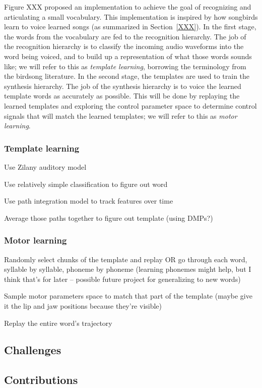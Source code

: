 \documentclass{article}
\begin{document}
Figure XXX proposed an implementation
to achieve the goal of recognizing
and articulating a small vocabulary.
This implementation is inspired by
how songbirds learn to voice
learned songs (as summarized in Section~\ref{XXX}).
In the first stage, the words from
the vocabulary are fed to the
recognition hierarchy.
The job of the recognition hierarchy
is to classify the incoming
audio waveforms into the word
being voiced,
and to build up a representation
of what those words sounds like;
we will refer to this as
\textit{template learning},
borrowing the terminology
from the birdsong literature.
In the second stage, the templates
are used to train the
synthesis hierarchy.
The job of the synthesis hierarchy
is to voice the learned template words
as accurately as possible.
This will be done by replaying
the learned templates and
exploring the control parameter space
to determine control signals
that will match the learned templates;
we will refer to this as
\textit{motor learning}.

\subsubsection{Template learning}

Use Zilany auditory model

Use relatively simple classification to figure out word

Use path integration model to track features over time

Average those paths together to figure out template (using DMPs?)

\subsubsection{Motor learning}

Randomly select chunks of the template and replay
OR
go through each word, syllable by syllable, phoneme by phoneme
(learning phonemes might help, but I think that's for later
-- possible future project for generalizing to new words)

Sample motor parameters space to match that part of the template
(maybe give it the lip and jaw positions because they're visible)

Replay the entire word's trajectory

\subsection{Challenges}



\subsection{Contributions}
\end{document}
